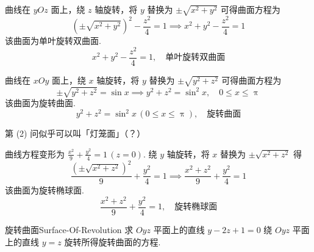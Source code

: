 \begin{solution}

    曲线在 $yOz$ 面上，绕 $z$ 轴旋转，将 $y$ 替换为 $\pm \sqrt{x^2 + y^2}$ 可得曲面方程为
    \begin{equation*}
        (\pm \sqrt{x^2 + y^2})^2 - \frac{z^2}{4} = 1 \implies x^2 + y^2 - \frac{z^2}{4} = 1
    \end{equation*}
    该曲面为单叶旋转双曲面.
    \begin{equation*}
        \boxed{x^2 + y^2 - \frac{z^2}{4} = 1, \quad \text{单叶旋转双曲面}}
    \end{equation*}


    曲线在 $xOy$ 面上，绕 $x$ 轴旋转，将 $y$ 替换为 $\pm \sqrt{y^2 + z^2}$ 可得曲面方程为
    \begin{equation*}
        \pm \sqrt{y^2 + z^2} = \sin x \implies y^2 + z^2 = \sin^2 x, \quad 0 \le x \le \uppi
    \end{equation*}
    该曲面为旋转曲面.
    \begin{equation*}
        \boxed{y^2 + z^2 = \sin^2 x \, (0 \le x \le \uppi), \quad \text{旋转曲面}}
    \end{equation*}

    \begin{note}{}{}
        第 (2) 问似乎可以叫「灯笼面」（？）
    \end{note}


    曲线方程变形为 $\frac{x^2}{9} + \frac{y^2}{4} = 1 \, (z=0)$. 绕 $y$ 轴旋转，将 $x$ 替换为 $\pm \sqrt{x^2 + z^2}$ 得
    \begin{equation*}
        \frac{(\pm \sqrt{x^2 + z^2})^2}{9} + \frac{y^2}{4} = 1 \implies \frac{x^2 + z^2}{9} + \frac{y^2}{4} = 1
    \end{equation*}
    该曲面为旋转椭球面.
    \begin{equation*}
        \boxed{\frac{x^2 + z^2}{9} + \frac{y^2}{4} = 1, \quad \text{旋转椭球面}}
    \end{equation*}
\end{solution}


\begin{problem}{旋转曲面}{Surface-Of-Revolution}
    求 $Oyz$ 平面上的直线 $y - 2z + 1 = 0$ 绕 $Oyz$ 平面上的直线 $y = z$ 旋转所得旋转曲面的方程.
\end{problem}

